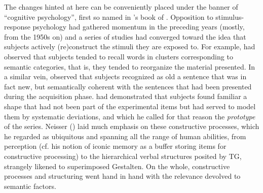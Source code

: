 \documentclass[english,output=paper,colorlinks,citecolor=brown]{../langscibook}
\begin{document}
The changes hinted at here can be conveniently placed under the banner of “cognitive psychology”, first so named in \citeauthor{Neisser1967}’s book of \citeyear{Neisser1967}. Opposition to stimulus-response psychology had gathered momentum in the preceding years (mostly, from the 1950s on) and a series of studies had converged toward the idea that subjects actively (re)construct the stimuli they are exposed to. For example, \citet{Bousfield1953} had observed that subjects tended to recall words in clusters corresponding to semantic categories, that is, they tended to reorganize the material presented. In a similar vein, \citet{BransfordFranks1971} observed that subjects recognized as old a sentence that was in fact new, but semantically coherent with the sentences that had been presented during the acquisition phase. \citet{Attneave1957} had demonstrated that subjects found familiar a shape that had not been part of the experimental items but had served to model them by systematic deviations, and which he called for that reason the \textit{prototype} of the series. Neisser (\citeyear{Neisser1967}) laid much emphasis on these constructive processes, which he regarded as ubiquitous and spanning all the range of human abilities, from perception (cf. his notion of iconic memory as a buffer storing items for constructive processing) to the hierarchical verbal structures posited by TG, strangely likened to superimposed Gestalten. On the whole, constructive processes and structuring went hand in hand with the relevance devolved to semantic factors.
\end{document}
